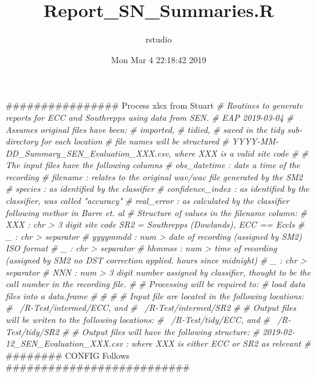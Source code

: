 \documentclass[]{article}
\title{Report\_SN\_Summaries.R}
\author{rstudio}
\date{Mon Mar 4 22:18:42 2019}
\newenvironment{Shaded}{\begin{snugshade}}{\end{snugshade}}
\newcommand{\CommentTok}[1]{\textcolor[rgb]{0.56,0.35,0.01}{\textit{#1}}}
\newcommand{\NormalTok}[1]{#1}
\begin{document}
\maketitle

\begin{Shaded}
\begin{Highlighting}[]
\NormalTok{################ Process xlsx from Stuart}
\CommentTok{# Routines to generate reports for ECC and Southrepps using data from SEN.}
\CommentTok{# EAP 2019-03-04}
\CommentTok{# Assumes original files have been:}
\CommentTok{#   imported,}
\CommentTok{#   tidied,}
\CommentTok{#   saved in the tidy sub-directory for each location}
\CommentTok{#   file names will be structured}
\CommentTok{#     YYYY-MM-DD_Summary_SEN_Evaluation_XXX.csv, where XXX is a valid site code}
\CommentTok{#  }
\CommentTok{# The input files have the following columns }
\CommentTok{#   obs_datetime : date a time of the recording }
\CommentTok{#   filename : relates to the original wav/wac file generated by the SM2}
\CommentTok{#   species : as identified by the classifier}
\CommentTok{#   confidence_index : as identified by the classifier, was called "accuracy"}
\CommentTok{#   real_error : as calculated by the classifier following methor in Barre et. al}
\CommentTok{# Structure of values in the filename column:}
\CommentTok{#   XXX             : chr > 3 digit site code  SR2 = Southrepps (Dowlands), ECC == Eccls}
\CommentTok{#   _               : chr > separator}
\CommentTok{#   yyyymmdd        : num > date of recording (assigned by SM2) ISO format}
\CommentTok{#   _               : chr > separator}
\CommentTok{#   hhmmss          : num > time of recording (assigned by SM2 no DST correction applied. hours since midnight)}
\CommentTok{#   _               : chr > separator}
\CommentTok{#   NNN              : num > 3 digit number assigned by classifier, thought to be the call number in the recording file.}
\CommentTok{#}
\CommentTok{# Processing will be required to:}
\CommentTok{#   load data files into a data.frame}
\CommentTok{#   }
\CommentTok{#   }
\CommentTok{#}
\CommentTok{# Input file are located in the following locations:}
\CommentTok{#   ~/R-Test/intermed/ECC, and}
\CommentTok{#   ~/R-Test/intermed/SR2}
\CommentTok{#}
\CommentTok{# Output files will be writen to the following locations:}
\CommentTok{#   ~/R-Test/tidy/ECC, and}
\CommentTok{#   ~/R-Test/tidy/SR2}
\CommentTok{#}
\CommentTok{# Output files will have the following structure:}
\CommentTok{#   2019-02-12_SEN_Evaluation_XXX.csv : where XXX is either ECC or SR2 as relevant}
\CommentTok{#}
\NormalTok{########  CONFIG Follows ##########################}


\end{Highlighting}
\end{Shaded}
\end{document}
